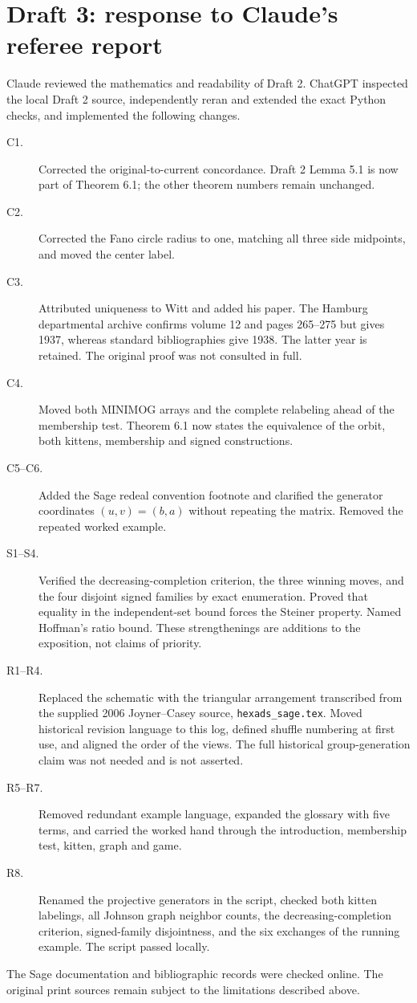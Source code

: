 \documentclass[12pt,letterpaper]{article}
\begin{document}
\section{Draft 3: response to Claude's referee report}
Claude reviewed the mathematics and readability of Draft 2. ChatGPT inspected the local Draft 2 source, independently reran and extended the exact Python checks, and implemented the following changes.
\begin{description}
\item[C1.] Corrected the original-to-current concordance. Draft 2 Lemma 5.1 is now part of Theorem 6.1; the other theorem numbers remain unchanged.
\item[C2.] Corrected the Fano circle radius to one, matching all three side midpoints, and moved the center label.
\item[C3.] Attributed uniqueness to Witt and added his paper. The Hamburg departmental archive confirms volume 12 and pages 265--275 but gives 1937, whereas standard bibliographies give 1938. The latter year is retained. The original proof was not consulted in full.
\item[C4.] Moved both MINIMOG arrays and the complete relabeling ahead of the membership test. Theorem 6.1 now states the equivalence of the orbit, both kittens, membership and signed constructions.
\item[C5--C6.] Added the Sage redeal convention footnote and clarified the generator coordinates $(u,v)=(b,a)$ without repeating the matrix. Removed the repeated worked example.
\item[S1--S4.] Verified the decreasing-completion criterion, the three winning moves, and the four disjoint signed families by exact enumeration. Proved that equality in the independent-set bound forces the Steiner property. Named Hoffman's ratio bound. These strengthenings are additions to the exposition, not claims of priority.
\item[R1--R4.] Replaced the schematic with the triangular arrangement transcribed from the supplied 2006 Joyner--Casey source, \texttt{hexads\_sage.tex}. Moved historical revision language to this log, defined shuffle numbering at first use, and aligned the order of the views. The full historical group-generation claim was not needed and is not asserted.
\item[R5--R7.] Removed redundant example language, expanded the glossary with five terms, and carried the worked hand through the introduction, membership test, kitten, graph and game.
\item[R8.] Renamed the projective generators in the script, checked both kitten labelings, all Johnson graph neighbor counts, the decreasing-completion criterion, signed-family disjointness, and the six exchanges of the running example. The script passed locally.
\end{description}
The Sage documentation and bibliographic records were checked online. The original print sources remain subject to the limitations described above.
\end{document}
